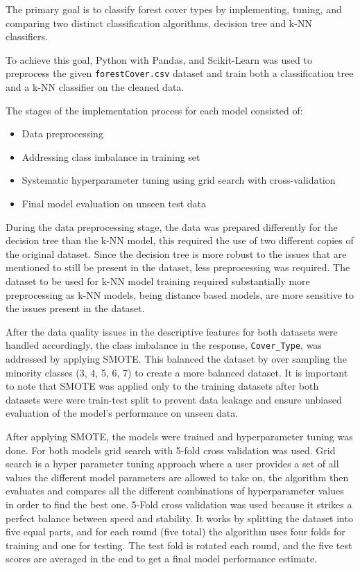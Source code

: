 \documentclass[conference]{IEEEtran}
\begin{document}
The primary goal is to classify forest cover types by implementing, tuning, and comparing two distinct classification algorithms, decision tree and k-NN classifiers.

To achieve this goal, Python with Pandas, and Scikit-Learn was used to preprocess the given \texttt{forestCover.csv} dataset and train both a classification tree and a k-NN classifier on the cleaned data.

The stages of the implementation process for each model consisted of: 

\begin{itemize}
    \item Data preprocessing
    \item Addressing class imbalance in training set
    \item Systematic hyperparameter tuning using grid search with cross-validation
    \item Final model evaluation on unseen test data
\end{itemize}

During the data preprocessing stage, the data was prepared differently for the decision tree than the k-NN model, this required the use of two different copies of the original dataset. Since the decision tree is more robust to the issues that are mentioned to still be present in the dataset, less preprocessing was required. The dataset to be used for k-NN model training required substantially more preprocessing as k-NN models, being distance based models, are more sensitive to the issues present in the dataset.

After the data quality issues in the descriptive features for both datasets were handled accordingly, the class imbalance in the response, \texttt{Cover\_Type}, was addressed by applying SMOTE. This balanced the dataset by over sampling the minority classes (3, 4, 5, 6, 7) to create a more balanced dataset. It is important to note that SMOTE was applied only to the training datasets after both datasets were were train-test split to prevent data leakage and ensure unbiased evaluation of the model's performance on unseen data.

After applying SMOTE, the models were trained and hyperparameter tuning was done. For both models grid search with 5-fold cross validation was used. Grid search is a hyper parameter tuning approach where a user provides a set of all values the different model parameters are allowed to take on, the algorithm then evaluates and compares all the different combinations of hyperparameter values in order to find the best one. 5-Fold cross validation was used because it strikes a perfect balance between speed and stability. It works by splitting the dataset into five equal parts, and for each round (five total) the algorithm uses four folds for training and one for testing. The test fold is rotated each round, and the five test scores are averaged in the end to get a final model performance estimate.
\end{document}
